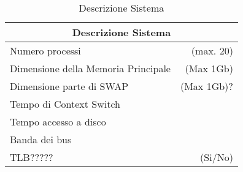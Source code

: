 \newpage	
	
\begin{table}[h]
	\begin{center}
		  \begin{tabular}{|p{}|r|}
		 \hline
			\multicolumn{2}{|c|}{\textbf{Descrizione Sistema}}\\
		 \hline
		Numero processi & (max. 20)\\
		Dimensione della Memoria Principale & (Max 1Gb) \\
		Dimensione parte di SWAP & (Max 1Gb)? \\
		Tempo di Context Switch & \\
		Tempo accesso a disco & \\
		Banda dei bus & \\
		TLB????? & (Si/No)\\
		\hline %
		\end{tabular}
	\caption{Descrizione Sistema} %
	\label{tabdescrsistema}
	\end{center}	
\end{table}


